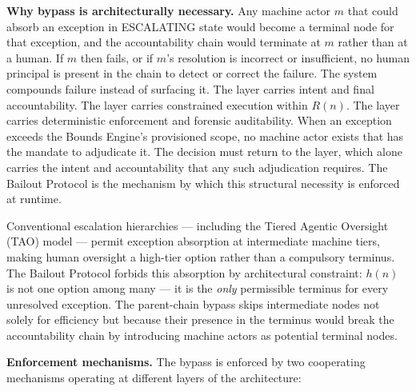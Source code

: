 \bigskip
\noindent\textbf{Why bypass is architecturally necessary.} Any machine actor $m$ that could absorb an exception in ESCALATING state would become a terminal node for that exception, and the accountability chain would terminate at $m$ rather than at a human. If $m$ then fails, or if $m$'s resolution is incorrect or insufficient, no human principal is present in the chain to detect or correct the failure. The system compounds failure instead of surfacing it. The \purpose{} layer carries intent and final accountability. The \bounds{} layer carries constrained execution within $R(n)$. The \fact{} layer carries deterministic enforcement and forensic auditability. When an exception exceeds the Bounds Engine's provisioned scope, no machine actor exists that has the mandate to adjudicate it. The decision must return to the \purpose{} layer, which alone carries the intent and accountability that any such adjudication requires. The Bailout Protocol is the mechanism by which this structural necessity is enforced at runtime.

Conventional escalation hierarchies --- including the Tiered Agentic Oversight (TAO) model \cite{kim2025tao} --- permit exception absorption at intermediate machine tiers, making human oversight a high-tier option rather than a compulsory terminus. The Bailout Protocol forbids this absorption by architectural constraint: $h(n)$ is not one option among many --- it is the \emph{only} permissible terminus for every unresolved exception. The parent-chain bypass skips intermediate nodes not solely for efficiency but because their presence in the terminus would break the accountability chain by introducing machine actors as potential terminal nodes.

\bigskip
\noindent\textbf{Enforcement mechanisms.} The bypass is enforced by two cooperating mechanisms operating at different layers of the \bxthree{} architecture:

